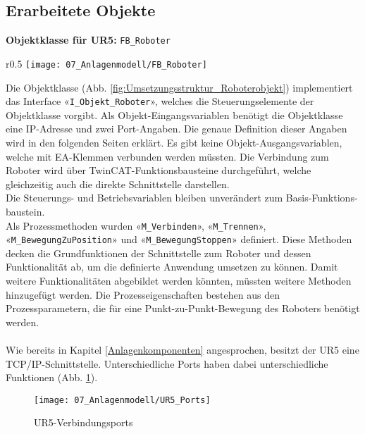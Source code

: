 		\newpage
		
	\subsection{Erarbeitete Objekte} \label{Objekt_Erarbeitet}
	
		\textbf{Objektklasse für UR5:} \verb|FB_Roboter|
		\vspace{2mm}
		\vspace{-10mm}  
		\\
		\begin{wrapfigure}{r}{0.5\textwidth}
			\centering
			\texttt{[image: 07\_Anlagenmodell/FB\_Roboter]}
			\captionsetup{justification=centering}
			\caption{Umsetzungsstruktur von Roboter-Objekt}
			\label{fig:Umsetzungsstruktur_Roboterobjekt}
		\end{wrapfigure} \par
		Die Objektklasse (Abb. \ref{fig:Umsetzungsstruktur_Roboterobjekt}) implementiert das Interface «\verb|I_Objekt_Roboter|», welches die Steuerungselemente der Objektklasse vorgibt. Als Objekt-Eingangsvariablen benötigt die Objektklasse eine IP-Adresse und zwei Port-Angaben. Die genaue Definition dieser Angaben wird in den folgenden Seiten erklärt. Es gibt keine Objekt-Ausgangsvariablen, welche mit EA-Klemmen verbunden werden müssten. Die Verbindung zum Roboter wird über TwinCAT-Funktionsbausteine durchgeführt, welche gleichzeitig auch die direkte Schnittstelle darstellen.
		\\
		Die Steuerungs- und Betriebsvariablen bleiben unverändert zum Basis-Funktions-baustein. 
		\\
		Als Prozessmethoden wurden «\verb|M_Verbinden|», «\verb|M_Trennen|», «\verb|M_BewegungZuPosition|» und «\verb|M_BewegungStoppen|» definiert. Diese Methoden decken die Grundfunktionen der Schnittstelle zum Roboter und dessen Funktionalität ab, um die definierte Anwendung umsetzen zu können. Damit weitere Funktionalitäten abgebildet werden könnten, müssten weitere Methoden hinzugefügt werden. Die Prozesseigenschaften bestehen aus den Prozessparametern, die für eine Punkt-zu-Punkt-Bewegung des Roboters benötigt werden.
		\\
		\\
		Wie bereits in Kapitel \ref{Anlagenkomponenten} angesprochen, besitzt der UR5 eine TCP/IP-Schnittstelle. Unterschiedliche Ports haben dabei unterschiedliche Funktionen (Abb. \ref{fig:Verbindungsports}). 
		
		\begin{figure}[h!]
			\centering
			\texttt{[image: 07\_Anlagenmodell/UR5\_Ports]}
			\captionsetup{justification=centering}
			\caption{UR5-Verbindungsports}
			\label{fig:Verbindungsports}
		\end{figure}
		
